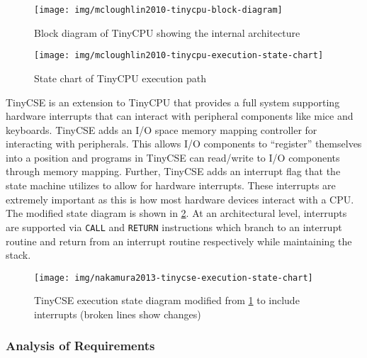 \begin{figure}[t!]
    \centering
    \texttt{[image: img/mcloughlin2010-tinycpu-block-diagram]}
    \caption{Block diagram of TinyCPU showing the internal architecture\cite[p.~869]{McLoughlin2010}}
    \label{fig:mcloughlin2010-tinycpu-block-diagram}
    \texttt{[image: img/mcloughlin2010-tinycpu-execution-state-chart]}
    \caption{State chart of TinyCPU execution path\cite[p.~869]{McLoughlin2010}}
    \label{fig:mcloughlin2010-tinycpu-state-chart}
\end{figure}

TinyCSE is an extension to TinyCPU that provides a full system supporting hardware interrupts that can interact with peripheral components like mice and keyboards\cite{Nakamura2013}. TinyCSE adds an I/O space memory mapping controller for interacting with peripherals. This allows I/O components to ``register'' themselves into a position and programs in TinyCSE can read/write to I/O components through memory mapping. Further, TinyCSE adds an interrupt flag that the state machine utilizes to allow for hardware interrupts. These interrupts are extremely important as this is how most hardware devices interact with a CPU. The modified state diagram is shown in \cref{fig:nakamura2013-tinycse-execution-state-chart}. At an architectural level, interrupts are supported via \verb|CALL| and \verb|RETURN| instructions which branch to an interrupt routine and return from an interrupt routine respectively while maintaining the stack.

\begin{figure}[b!]
    \centering
    \texttt{[image: img/nakamura2013-tinycse-execution-state-chart]}
    \caption{TinyCSE execution state diagram modified from \cref{fig:mcloughlin2010-tinycpu-state-chart} to include interrupts (broken lines show changes)\cite[p.~640]{Nakamura2013}}
    \label{fig:nakamura2013-tinycse-execution-state-chart}
\end{figure}

\subsubsection*{Analysis of Requirements}

